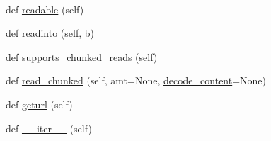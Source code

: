 \begin{DoxyCompactItemize}
$$\item 
def \hyperlink{classpip_1_1__vendor_1_1urllib3_1_1response_1_1HTTPResponse_a339edb15d6f8153f013ca209e9e9b3f1}{readable} (self)
\item 
def \hyperlink{classpip_1_1__vendor_1_1urllib3_1_1response_1_1HTTPResponse_a3b25c326d49b1d81c2b177e01f46b210}{readinto} (self, b)
\item 
def \hyperlink{classpip_1_1__vendor_1_1urllib3_1_1response_1_1HTTPResponse_a2a1912a3eac26ffca9f80fa1ab140126}{supports\+\_\+chunked\+\_\+reads} (self)
\item 
def \hyperlink{classpip_1_1__vendor_1_1urllib3_1_1response_1_1HTTPResponse_a4c7a442f95795a5db145a0680ffbd658}{read\+\_\+chunked} (self, amt=None, \hyperlink{classpip_1_1__vendor_1_1urllib3_1_1response_1_1HTTPResponse_a549e8dc33482f73e462d07d9816ab257}{decode\+\_\+content}=None)
\item 
def \hyperlink{classpip_1_1__vendor_1_1urllib3_1_1response_1_1HTTPResponse_aed23b91f07609d31e43919710fa13e5b}{geturl} (self)
\item 
def \hyperlink{classpip_1_1__vendor_1_1urllib3_1_1response_1_1HTTPResponse_a6c8b3fa3d2feed5623f67b3cf07755dd}{\+\_\+\+\_\+iter\+\_\+\+\_\+} (self)
\end{DoxyCompactItemize}
